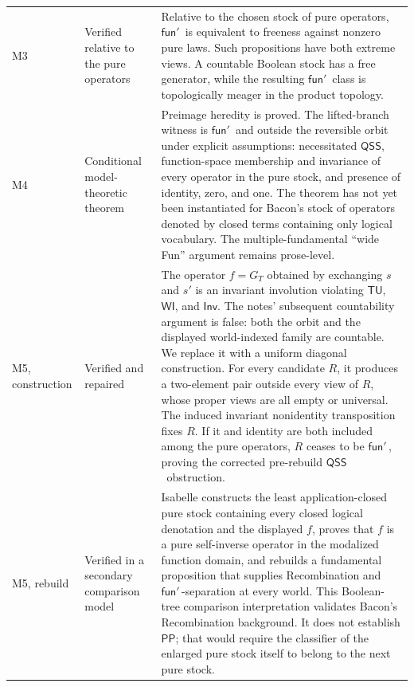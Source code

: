 \documentclass[12pt,leqno]{article}
\theoremstyle{plain}
\theoremstyle{definition}
\newcommand{\funp}{\ensuremath{\mathsf{fun}'\,}}
\newcommand{\PP}{\ensuremath{\mathsf{PP}}}
\newcommand{\QSS}{\ensuremath{\mathsf{QSS}}}
\newcommand{\TU}{\ensuremath{\mathsf{TU}}}
\newcommand{\WI}{\ensuremath{\mathsf{WI}}}
\newcommand{\Inv}{\ensuremath{\mathsf{Inv}}}
\begin{document}
\begin{longtable}{>{\raggedright\arraybackslash}p{0.55in}
                  >{\raggedright\arraybackslash}p{1.28in}
                  >{\raggedright\arraybackslash}p{4.25in}}
M3 & Verified relative to the pure operators &
Relative to the chosen stock of pure operators, \(\funp\) is equivalent to freeness
against nonzero pure laws.  Such propositions have both extreme views.  A
countable Boolean stock has a free generator, while the resulting
\(\funp\) class is topologically meager in the product topology.\\

M4 & Conditional model-theoretic theorem &
Preimage heredity is proved.  The lifted-branch witness is \(\funp\) and
outside the reversible orbit under explicit assumptions: necessitated
\QSS, function-space membership and invariance of every operator in the pure
stock, and presence of identity, zero, and one.  The theorem has not
yet been instantiated for Bacon's stock of operators denoted by closed terms
containing only logical vocabulary.  The
multiple-fundamental ``wide Fun'' argument remains prose-level.\\

M5, construction & Verified and repaired &
The operator \(f=G_T\) obtained by exchanging \(s\) and \(s'\) is an invariant involution violating \TU, \WI,
and \Inv.  The notes' subsequent countability argument is false: both the
orbit and the displayed world-indexed family are countable.  We replace it
with a uniform diagonal construction.  For every candidate \(R\), it
produces a two-element pair outside every view of \(R\), whose proper views
are all empty or universal.  The induced invariant nonidentity
transposition fixes \(R\).  If it and identity are both included among the
pure operators, \(R\)
ceases to be \(\funp\), proving the corrected pre-rebuild \QSS\
obstruction.\\

M5, rebuild & Verified in a secondary comparison model &
Isabelle constructs
the least application-closed pure stock containing every closed logical
denotation and the displayed \(f\), proves that \(f\) is a pure self-inverse
operator in the modalized function domain, and rebuilds a fundamental
proposition that supplies Recombination and \(\funp\)-separation at every
world.  This Boolean-tree comparison interpretation validates Bacon's Recombination
background.  It does not establish \PP; that would require the classifier of
the enlarged pure stock itself to belong to the next pure stock.\\


\end{longtable}
\end{document}
